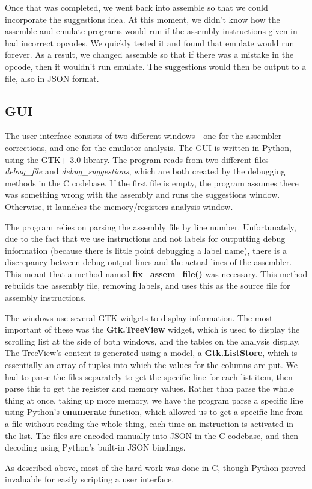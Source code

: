 \documentclass[11pt]{article}
\begin{document}
Once that was completed, we went back into assemble so that we could incorporate the suggestions idea. At this moment, we didn't know how the assemble and emulate programs would run if the assembly instructions given in had incorrect opcodes. We quickly tested it and found that emulate would run forever. As a result, we changed assemble so that if there was a mistake in the opcode, then it wouldn't run emulate. The suggestions would then be output to a file, also in JSON format.

\subsection{GUI}
The user interface consists of two different windows - one for the assembler corrections, and one for the emulator analysis. The GUI is written in Python, using the GTK+ 3.0 library. The program reads from two different files - {\it debug\_file} and {\it debug\_suggestions}, which are both created by the debugging methods in the C codebase. If the first file is empty, the program assumes there was something wrong with the assembly and runs the suggestions window. Otherwise, it launches the memory/registers analysis window.

The program relies on parsing the assembly file by line number. Unfortunately, due to the fact that we use instructions and not labels for outputting debug information (because there is little point debugging a label name), there is a discrepancy between debug output lines and the actual lines of the assembler. This meant that a method named {\bf fix\_assem\_file()} was necessary. This method rebuilds the assembly file, removing labels, and uses this as the source file for assembly instructions.

The windows use several GTK widgets to display information. The most important of these was the {\bf Gtk.TreeView} widget, which is used to display the scrolling list at the side of both windows, and the tables on the analysis display. The TreeView's content is generated using a model, a {\bf Gtk.ListStore}, which is essentially an array of tuples into which the values for the columns are put. We had to parse the files separately to get the specific line for each list item, then parse this to get the register and memory values. Rather than parse the whole thing at once, taking up more memory, we have the program parse a specific line using Python's {\bf enumerate} function, which allowed us to get a specific line from a file without reading the whole thing, each time an instruction is activated in the list. The files are encoded manually into JSON in the C codebase, and then decoding using Python's built-in JSON bindings.

As described above, most of the hard work was done in C, though Python proved invaluable for easily scripting a user interface.
\end{document}
